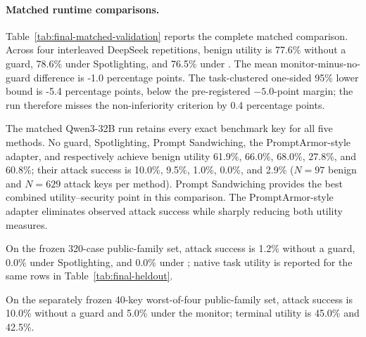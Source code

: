 \paragraph{Matched runtime comparisons.}



Table~\ref{tab:final-matched-validation} reports the complete matched comparison. Across four interleaved DeepSeek repetitions, benign utility is 77.6\% without a guard, 78.6\% under Spotlighting, and 76.5\% under \sys{}. The mean monitor-minus-no-guard difference is -1.0 percentage points. The task-clustered one-sided 95\% lower bound is -5.4 percentage points, below the pre-registered $-5.0$-point margin; the run therefore misses the non-inferiority criterion by 0.4 percentage points.

The matched Qwen3-32B run retains every exact benchmark key for all five methods.  No guard, Spotlighting, Prompt Sandwiching, the PromptArmor-style adapter, and \sys{} respectively achieve benign utility 61.9\%, 66.0\%, 68.0\%, 27.8\%, and 60.8\%; their attack success is 10.0\%, 9.5\%, 1.0\%, 0.0\%, and 2.9\% ($N=97$ benign and $N=629$ attack keys per method). Prompt Sandwiching provides the best combined utility--security point in this comparison. The PromptArmor-style adapter eliminates observed attack success while sharply reducing both utility measures.



On the frozen 320-case public-family set, attack success is 1.2\% without a guard, 0.0\% under Spotlighting, and 0.0\% under \sys{}; native task utility is reported for the same rows in Table~\ref{tab:final-heldout}.

On the separately frozen 40-key worst-of-four public-family set, attack success is 10.0\% without a guard and 5.0\% under the monitor; terminal utility is 45.0\% and 42.5\%.
